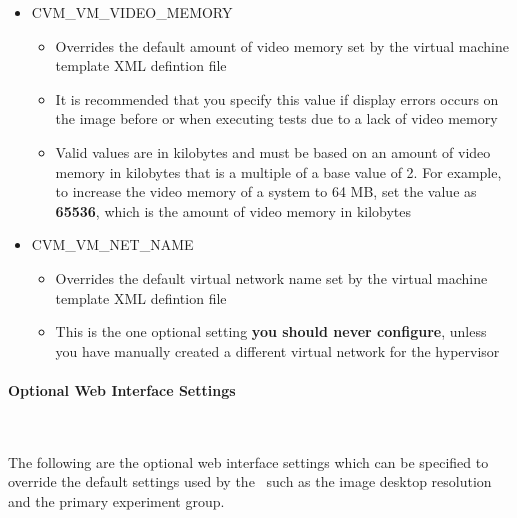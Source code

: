 \begin{itemize}
\item	CVM\_VM\_VIDEO\_MEMORY
		\begin{itemize}
		\item	Overrides the default amount of video memory set by the virtual machine
				template XML defintion file
		\item	It is recommended that you specify this value if display errors occurs on the
				\cernvm image before or when executing tests due to a lack of video memory
		\item	Valid values are in kilobytes and must be based on an amount of video memory in
				kilobytes that is a multiple of a base value of 2. For example, to increase
				the video memory of a system to 64 MB, set the value as {\bf 65536}, which is the
				amount of video memory in kilobytes
		\end{itemize}
		
\item	CVM\_VM\_NET\_NAME
		\begin{itemize}
		\item	Overrides the default virtual network name set by the virtual machine
				template XML defintion file
		\item	This is the one optional setting {\bf you should never configure}, unless you have
	  			manually created a different virtual network for the hypervisor
		\end{itemize}


\end{itemize}


\paragraph*{Optional Web Interface Settings}~\newline

The following are the optional web interface settings which can be specified to override
the default settings used by the \cernvmtestframework\, such as the \cernvm image desktop
resolution and the primary experiment group.

